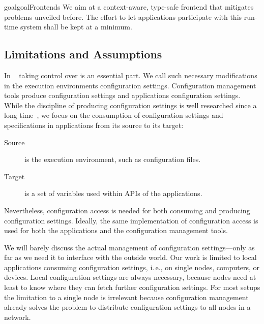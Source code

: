 \begin{restatable}[Frontend]{goal}{goalFrontends}
We aim at a context-aware, type-safe frontend that mitigates problems unveiled before.
The effort to let applications participate with this run-time system shall be kept at a minimum.
\end{restatable}

\subsection{Limitations and Assumptions}

In ~\cite{cons2002pan,huang2015confvalley} taking control over  is an essential part.
We call such necessary modifications in the execution environments  configuration settings.
Configuration management tools produce configuration settings and applications  configuration settings.
While the discipline of producing configuration settings is well researched since a long time~\cite{burgess1995cfengine}, we focus on the consumption of configuration settings and specifications in applications from its source to its target:
\begin{description}
 \item[Source] is the execution environment, such as configuration files.
 \item[Target] is a set of variables used within APIs of the applications.
\end{description}

Nevertheless, configuration access is needed for both consuming and producing configuration settings.
Ideally, the same implementation of configuration access is used for both the applications and the configuration management tools.

We will barely discuss the actual management of configuration settings---only as far as we need it to interface with the outside world.
Our work is limited to local applications consuming configuration settings, i.\,e., on single nodes, computers, or devices.
Local configuration settings are always necessary, because nodes need at least to know where they can fetch further configuration settings.
For most setups the limitation to a single node is irrelevant because configuration management already solves the problem to distribute configuration settings to all nodes in a network.

